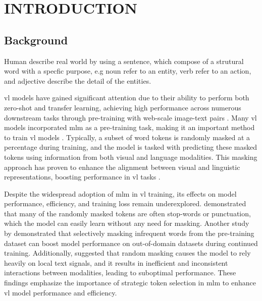 \setlength{\parindent}{0in}
\setlength{\parskip}{1.5mm}
\setlength{\baselineskip}{1.6em}

\chapter{INTRODUCTION}
\section{Background}
Human describe real world by using a sentence, which compose of a strutural word with a specfic purpose, e.g noun refer to an entity, verb refer to an action, and adjective describe the detail of the entities.


\acrfull{vl} models have gained significant attention due to their ability to perform both zero-shot and transfer learning, achieving high performance across numerous downstream tasks through pre-training with web-scale image-text pairs \cite{s-clip, medclip, vl-review}.  
Many \acrshort{vl} models incorporated \acrfull{mlm} as a pre-training task, making it an important method to train \acrshort{vl} models \cite{albef, mplug, uniter, beit-3, lxmert}.  
Typically, a subset of word tokens is randomly masked at a percentage during training, and the model is tasked with predicting these masked tokens using information from both visual and language modalities.  
This masking approach has proven to enhance the alignment between visual and linguistic representations, boosting performance in \acrshort{vl} tasks \cite{lxmert}.  

Despite the widespread adoption of \acrshort{mlm} in \acrshort{vl} training, its effects on model performance, efficiency, and training loss remain underexplored.  
 demonstrated that many of the randomly masked tokens are often stop-words or punctuation, which the model can easily learn without any need for masking.  
Another study by  demonstrated that selectively masking infrequent words from the pre-training dataset can boost model performance on out-of-domain datasets during continued training.  
Additionally,  suggested that random masking causes the model to rely heavily on local text signals, and it results in inefficient and inconsistent interactions between modalities, leading to suboptimal performance.  
These findings emphasize the importance of strategic token selection in \acrshort{mlm} to enhance \acrshort{vl} model performance and efficiency.  

